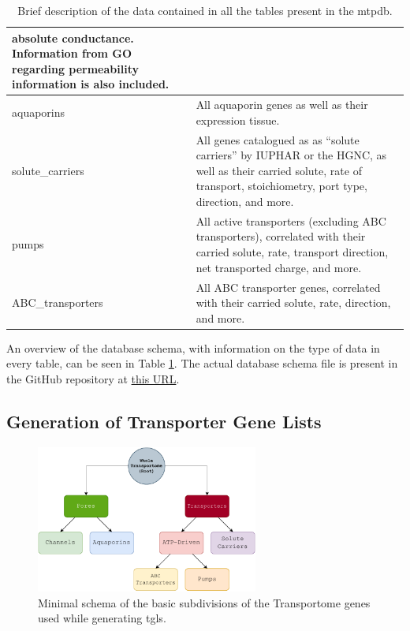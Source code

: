 \begin{table}
\begin{tabularx}{\textwidth}{|l|X|}
        absolute conductance. Information from GO regarding permeability information is also included. \\
        \hline
    aquaporins
        & All aquaporin genes as well as their expression tissue. \\
        \hline
    solute\_carriers
        & All genes catalogued as as ``solute carriers'' by IUPHAR or the HGNC,
        as well as their carried solute, rate of transport, stoichiometry, port
        type, direction, and more. \\
        \hline
    pumps
        & All active transporters (excluding ABC transporters), correlated with their carried solute, rate,
        transport direction, net transported charge, and more. \\
        \hline
    ABC\_transporters
        & All ABC transporter genes, correlated with their carried solute, rate,
        direction, and more. \\
        \hline
\end{tabularx}
\caption{Brief description of the data contained in all the tables present in
    the \gls{mtpdb}.}
\label{tab:databaseSchema}
\end{table}

An overview of the database schema, with information on the type of data in every table, can be seen in Table \ref{tab:databaseSchema}.
The actual database schema file is present in the GitHub repository at
\href{https://github.com/CMA-Lab/MTP-DB/blob/main/src/db_rebuilder/daedalus/local_data/schema.sql}{this URL}.

\subsection{Generation of Transporter Gene Lists}

\begin{figure}
    \centering
    \includegraphics[width=0.65\textwidth]{resources/images/BasicTree.pdf}
    \caption{Minimal schema of the basic subdivisions of the Transportome genes
        used while generating \glspl{tgl}.}
    \label{fig:BasicTree}
\end{figure}

